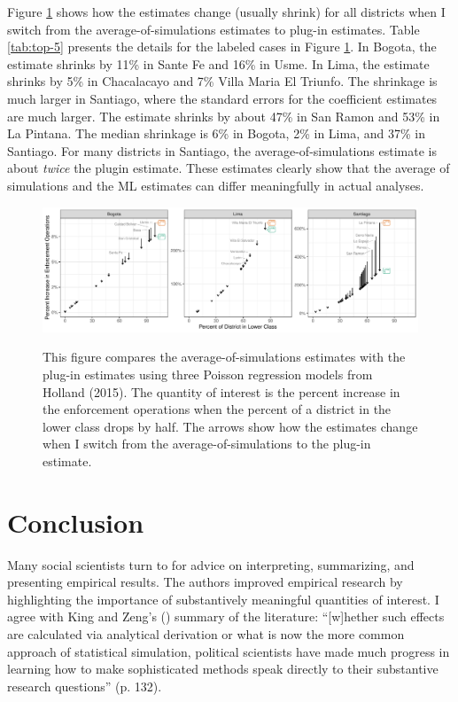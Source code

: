 \documentclass[12pt]{article}
\begin{document}
Figure \ref{fig:holland} shows how the estimates change (usually shrink) for all districts when I switch from the average-of-simulations estimates to plug-in estimates. Table \ref{tab:top-5} presents the details for the labeled cases in Figure \ref{fig:holland}. In Bogota, the estimate shrinks by 11\% in Sante Fe and 16\% in Usme. In Lima, the estimate shrinks by 5\% in Chacalacayo and 7\% Villa Maria El Triunfo. The shrinkage is much larger in Santiago, where the standard errors for the coefficient estimates are much larger. The estimate shrinks by about 47\% in San Ramon and 53\% in La Pintana. The median shrinkage is 6\% in Bogota, 2\% in Lima, and 37\% in Santiago. For many districts in Santiago, the average-of-simulations estimate is about \textit{twice} the plugin estimate. These estimates clearly show that the average of simulations and the ML estimates can differ meaningfully in actual analyses.

\begin{figure}[h]
\begin{center}
\includegraphics[width=\textwidth]{figs/holland.pdf}\\
\vspace{.1in}
\caption{This figure compares the average-of-simulations estimates with the plug-in estimates using three Poisson regression models from Holland (2015). The quantity of interest is the percent increase in the enforcement operations when the percent of a district in the lower class drops by half. The arrows show how the estimates change when I switch from the average-of-simulations to the plug-in estimate.}\label{fig:holland}
\end{center}
\end{figure}



\section*{Conclusion}

Many social scientists turn to \cite{KingTomzWittenberg2000} for advice on interpreting, summarizing, and presenting empirical results. The authors improved empirical research by highlighting the importance of substantively meaningful quantities of interest. I agree with King and Zeng's (\citeyear{king2006dangers}) summary of the literature: “[w]hether such effects are calculated via analytical derivation or what is now the more common approach of statistical simulation, political scientists have made much progress in learning how to make sophisticated methods speak directly to their substantive research questions” (p. 132). 
\end{document}
